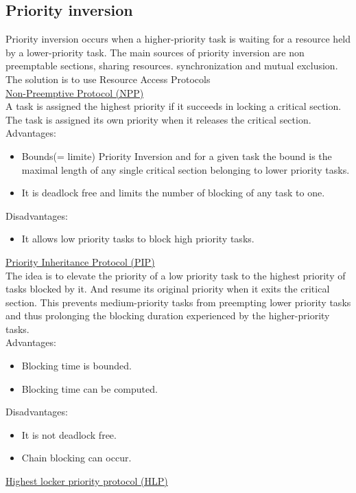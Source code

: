 \subsection*{Priority inversion}
Priority inversion occurs when a higher-priority task is waiting for a resource held by a
lower-priority task. The main sources of priority inversion are non preemptable sections,
sharing resources. synchronization and mutual exclusion. The solution is to use Resource
Access Protocols\\
\underline{Non-Preemptive Protocol (NPP)}\\
A task is assigned the highest priority if it succeeds in locking a critical section.
The task is assigned its own priority when it releases the critical section.\\
Advantages:
\begin{itemize}
    \item Bounds(= limite) Priority Inversion and for a given task the bound is the maximal length
          of any single critical section belonging to lower priority tasks.
    \item It is deadlock free and limits the number of blocking of any task to one.
\end{itemize}
Disadvantages:
\begin{itemize}
    \item It allows low priority tasks to block high priority tasks.
\end{itemize}
\underline{Priority Inheritance Protocol (PIP)}\\
The idea is to elevate the priority of a low priority task to the highest priority of tasks
blocked by it. And resume its original priority when it exits the critical section.
This prevents medium-priority tasks from preempting lower priority tasks and thus
prolonging the blocking duration experienced by the higher-priority tasks.\\
Advantages:
\begin{itemize}
    \item Blocking time is bounded.
    \item Blocking time can be computed.
\end{itemize}
Disadvantages:
\begin{itemize}
    \item It is not deadlock free.
    \item Chain blocking can occur.
\end{itemize}
\underline{Highest locker priority protocol (HLP)}\\
